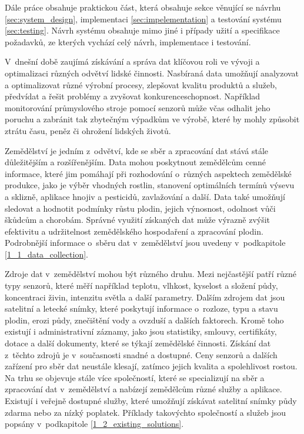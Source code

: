 Dále práce obsahuje praktickou část, která obsahuje sekce věnující se návrhu \ref{sec:system_design}, implementaci \ref{sec:impelementation} a testování systému \ref{sec:testing}. Návrh systému obsahuje mimo jiné i případy užití a specifikace požadavků, ze kterých vychází celý návrh, implementace i testování.



 \label{sec:actual_situation}
V~dnešní době zaujímá získávání a správa dat klíčovou roli ve vývoji a optimalizaci různých odvětví lidské činnosti. Nasbíraná data umožňují analyzovat a optimalizovat různé výrobní procesy, zlepšovat kvalitu produktů a služeb, předvídat a řešit problémy a zvyšovat konkurenceschopnost. Například monitorování průmyslového stroje pomocí senzorů může včas odhalit jeho poruchu a zabránit tak zbytečným výpadkům ve výrobě, které by mohly způsobit ztrátu času, peněz či ohrožení lidských životů.

Zemědělství je jedním z~odvětví, kde se sběr a zpracování dat stává stále důležitějším a rozšířenějším. Data mohou poskytnout zemědělcům cenné informace, které jim pomáhají při rozhodování o~různých aspektech zemědělské produkce, jako je výběr vhodných rostlin, stanovení optimálních termínů výsevu a sklizně, aplikace hnojiv a pesticidů, zavlažování a další. Data také umožňují sledovat a hodnotit podmínky růstu plodin, jejich výnosnost, odolnost vůči škůdcům a chorobám. Správné využití získaných dat může výrazně zvýšit efektivitu a udržitelnost zemědělského hospodaření a zpracování plodin. Podrobnější informace o~sběru dat v~zemědělství jsou uvedeny v~podkapitole \ref{1_1_data_collection}. 

Zdroje dat v~zemědělství mohou být různého druhu. Mezi nejčastější patří různé typy senzorů, které měří například teplotu, vlhkost, kyselost a složení půdy, koncentraci živin, intenzitu světla a další parametry. Dalším zdrojem dat jsou satelitní a letecké snímky, které poskytují informace o~rozloze, typu a stavu plodin, erozi půdy, znečištění vody a ovzduší a dalších faktorech. Kromě toho existují i administrativní záznamy, jako jsou statistiky, smlouvy, certifikáty, dotace a další dokumenty, které se týkají zemědělské činnosti. Získání dat z~těchto zdrojů je v~současnosti snadné a dostupné. Ceny senzorů a dalších zařízení pro sběr dat neustále klesají, zatímco jejich kvalita a spolehlivost rostou. Na trhu se objevuje stále více společností, které se specializují na sběr a zpracování dat v~zemědělství a nabízejí zemědělcům různé služby a aplikace. Existují i veřejně dostupné služby, které umožňují získávat satelitní snímky půdy zdarma nebo za nízký poplatek. Příklady takovýchto společností a služeb jsou popsány v~podkapitole \ref{1_2_existing_solutions}.

